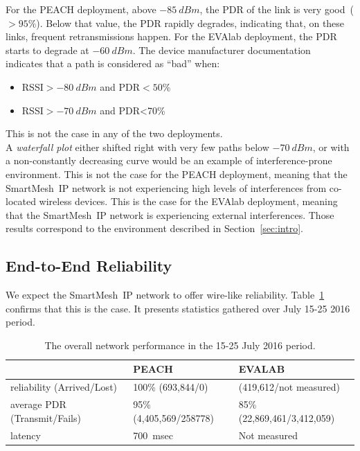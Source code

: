 \documentclass{elsarticle}
\newcommand{\smip}                {SmartMesh~IP\xspace}
\begin{document}
For the PEACH deployment, above $-85~dBm$, the PDR of the link is very good~($>95$\%).
Below that value, the PDR rapidly degrades, indicating that, on these links, frequent retransmissions happen.
For the EVAlab deployment, the PDR starts to degrade at $-60~dBm$.
The device manufacturer documentation~\cite{smip_app_note} indicates that a path is considered as ``bad'' when:

\begin{itemize}
    \item RSSI$>-80~dBm$ and PDR$<50$\%
    \item RSSI$>-70~dBm$ and PDR<70\%
\end{itemize}

This is not the case in any of the two deployments.\\


A \textit{waterfall plot} either shifted right with very few paths below $-70~dBm$, or with a non-constantly decreasing curve would be an example of interference-prone environment.
This is not the case for the PEACH deployment, meaning that the \smip network is not experiencing high levels of interferences from co-located wireless devices.
This is the case for the EVAlab deployment, meaning that the \smip network is experiencing external interferences.
Those results correspond to the environment described in Section~\ref{sec:intro}. 

\subsection{End-to-End Reliability}
\label{sec:net_reliability}


We expect the \smip network to offer wire-like reliability.
Table~\ref{tab:net_stats} confirms that this is the case.
It presents statistics gathered over July 15-25 2016 period.

\begin{table}
    \begin{tabular}{|l|l|l|}
        \hline
        {}	 							& PEACH 				  & EVALAB \\
        \hline
        reliability (Arrived/Lost) 		& 100\% (693,844/0) 	  & (419,612/not measured)\\ \hline
        average PDR (Transmit/Fails) 	& 95\% (4,405,569/258778) & 85\% (22,869,461/3,412,059)\\ \hline
        latency     					& 700~msec 				  & Not measured\\
        \hline
    \end{tabular}
    \caption{The overall network performance in the 15-25 July 2016 period.}
    \label{tab:net_stats}
\end{table}
\end{document}
